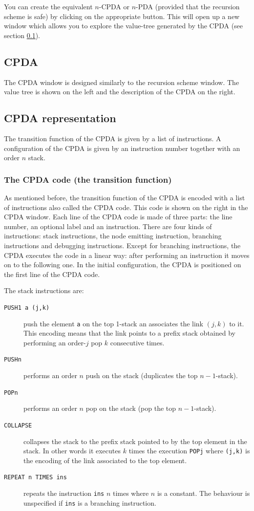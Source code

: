 \documentclass{article}
\begin{document}
You can create the equivalent $n$-CPDA or $n$-PDA (provided that the recursion scheme is safe) by clicking on the appropriate button. This will open up a new window which allows you to explore
the value-tree generated by the CPDA (see section \ref{sec:cpda}).



\subsection{CPDA}
\label{sec:cpda}
The CPDA window is designed similarly to the recursion scheme window. The value tree is shown on the left
 and the description of the CPDA on the right.

\subsection{CPDA representation}
The transition function of the CPDA is given by a list of instructions.
A configuration of the CPDA is given by an instruction number together with an order $n$ stack.

\subsubsection{The CPDA code (the transition function)}
As mentioned before, the transition function of the CPDA is encoded with a list of instructions also
called the CPDA code. This code is shown on the right in the CPDA window.
 Each line of the CPDA code is made of three parts: the line number, an optional label and an instruction. There are four kinds of instructions: stack instructions, the node emitting instruction, branching instructions and debugging instructions. Except for branching instructions, the CPDA executes the code in a linear way:
 after performing an instruction it moves on to the following one.
 In the initial configuration, the CPDA is positioned on the first line of the CPDA code.

The stack instructions are:
\begin{description}
  \item[{\tt PUSH1 a (j,k)}] push the element {\tt a} on the top 1-stack an associates the link $(j,k)$ to it. This encoding means that the link points to a prefix stack obtained by performing an order-$j$ pop $k$ consecutive times.
  \item[{\tt PUSHn}] performs an order $n$ push on the stack (duplicates the top $n-1$-stack).
  \item[{\tt POPn}] performs an order $n$ pop on the stack (pop the top $n-1$-stack).
  \item[{\tt COLLAPSE}] collapses the stack to the prefix stack pointed to by the top element in the stack. In other words it executes $k$ times the execution {\tt POPj} where {\tt (j,k)} is the encoding of the link associated to the top element.

  \item[{\tt REPEAT n TIMES ins}] repeats the instruction {\tt ins} $n$ times where $n$ is a constant. The behaviour is unspecified if {\tt ins} is a branching instruction.
\end{description}
\end{document}
